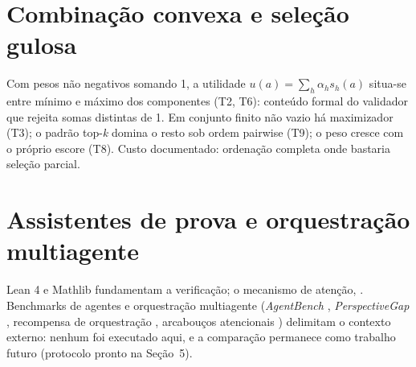 \section{Combinação convexa e seleção gulosa}
Com pesos não negativos somando 1, a utilidade $u(a)=\sum_h\alpha_h s_h(a)$ situa-se entre mínimo e máximo dos componentes (T2, T6): conteúdo formal do validador que rejeita somas distintas de 1. Em conjunto finito não vazio há maximizador (T3); o padrão top-\textit{k} domina o resto sob ordem pairwise (T9); o peso cresce com o próprio escore (T8). Custo documentado: ordenação completa onde bastaria seleção parcial.
\section{Assistentes de prova e orquestração multiagente}
Lean 4 \cite{moura2021} e Mathlib \cite{mathlib2020} fundamentam a verificação; o mecanismo de atenção, \cite{vaswani2017}. Benchmarks de agentes e orquestração multiagente (\textit{AgentBench} \cite{agentbench2023}, \textit{PerspectiveGap} \cite{perspectivegap2026}, recompensa de orquestração \cite{orchrm2026}, arcabouços atencionais \cite{orchestrator2025}) delimitam o contexto externo: nenhum foi executado aqui, e a comparação permanece como trabalho futuro (protocolo pronto na Seção~5).
